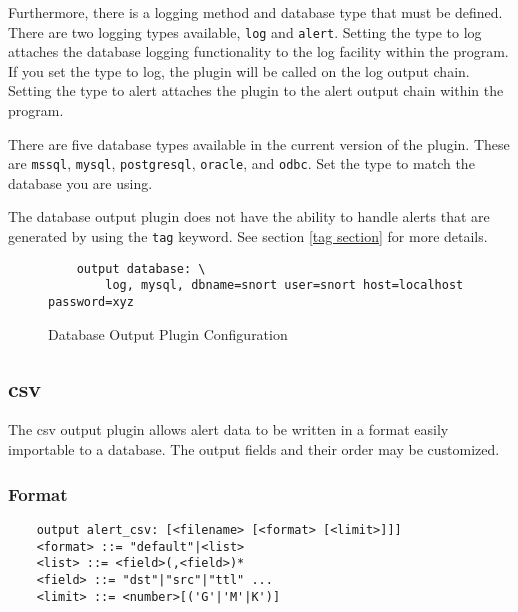 \documentclass[english]{report}
\newenvironment{note}{
\samepage
    \vspace{10pt}{\textsf{
        {\hspace{7pt}\Huge{$\triangle$\hspace{-12.5pt}{\Large{$^!$}}}}\hspace{5pt}
        {\Large{NOTE}}
    }
    }
   \begin{center}
    \par\vspace{-17pt}

    \begin{lrbox}{\savepar}
    \begin{minipage}[r]{6in}
}
{
    \end{minipage}
    \end{lrbox}
    \fbox{
        \usebox{
            \savepar
	}
    }
    \par\vskip10pt
    \end{center}
}
\newenvironment{note}{
        \begin{rawhtml}
        <p><table border="1"><tr><td><b>
        Note:&nbsp;&nbsp;</b>
        \end{rawhtml}
}{
        \begin{rawhtml}
        </b></td></tr></table></p>
        \end{rawhtml}
}
\begin{document}
Furthermore, there is a logging method and database type that must be defined.
There are two logging types available, \texttt{log} and \texttt{alert}.
Setting the type to log attaches the database logging functionality to the log
facility within the program. If you set the type to log, the plugin will be
called on the log output chain. Setting the type to alert attaches the plugin
to the alert output chain within the program.

There are five database types available in the current version of the plugin.
These are \texttt{mssql}, \texttt{mysql}, \texttt{postgresql}, \texttt{oracle},
and \texttt{odbc}.  Set the type to match the database you are using.

\begin{note}

The database output plugin does not have the ability to handle alerts that are
generated by using the \texttt{tag} keyword.  See section \ref{tag section} for
more details.

\end{note}

\begin{figure}

\begin{verbatim}
    output database: \
        log, mysql, dbname=snort user=snort host=localhost password=xyz
\end{verbatim}

\caption{Database Output Plugin Configuration}
\label{database output config}
\end{figure}

\subsection{csv}

The csv output plugin allows alert data to be written in a format easily
importable to a database.  The output fields and their order may be customized.

\subsubsection{Format}

\begin{verbatim}
    output alert_csv: [<filename> [<format> [<limit>]]]
    <format> ::= "default"|<list>
    <list> ::= <field>(,<field>)*
    <field> ::= "dst"|"src"|"ttl" ...
    <limit> ::= <number>[('G'|'M'|K')]
\end{verbatim}
\end{document}
